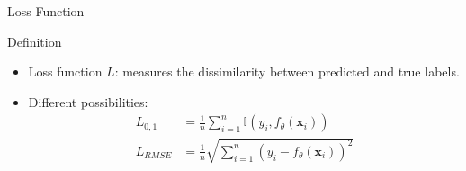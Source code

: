 \begin{frame}{Loss Function}
    \begin{definitionblock}{Definition}
        \centering
        \begin{itemize}
            \item<1-> Loss function $L$: measures the dissimilarity between predicted and true labels.
            \item<2-> Different possibilities:
            \begin{align*}
                L_{0, 1} &= \frac{1}{n} \sum_{i=1}^{n} \mathbb{I}(y_i, f_{\theta}(\mathbf{x}_i))\\
                L_{RMSE} &= \frac{1}{n}\sqrt{\sum_{i=1}^{n} {(y_i-f_{\theta}(\mathbf{x}_i))}^2}   
            \end{align*}
        \end{itemize}
    \end{definitionblock}
\end{frame}

